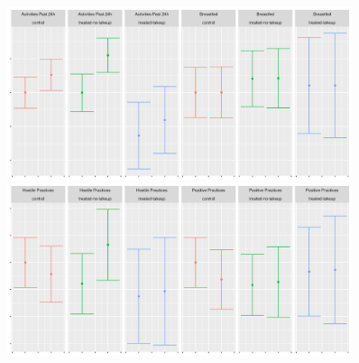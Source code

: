 \documentclass{article}
\begin{document}

\begin{figure}[H]
  \centering
\includegraphics[width=0.9\textwidth]{plots/pre_post/Serbia: Breastfed.png}
\includegraphics[width=0.9\textwidth]{plots/pre_post/Serbia: Positive Practices.png}
\end{figure}















% 
% 
% 
\end{document}
